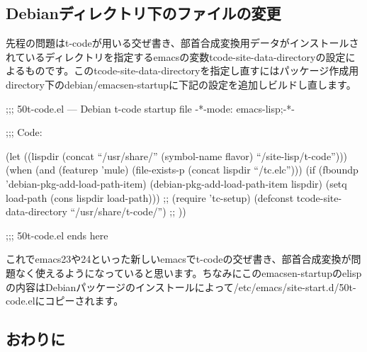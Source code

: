 \documentclass[mingoth,a4paper]{jsarticle}
\begin{document}
\subsection{Debianディレクトリ下のファイルの変更}
先程の問題はt-codeが用いる交ぜ書き、部首合成変換用データがインストールされているディレクトリを指定するemacsの変数tcode-site-data-directoryの設定によるものです。このtcode-site-data-directoryを指定し直すにはパッケージ作成用directory下のdebian/emacsen-startupに下記の設定を追加しビルドし直します。

\begin{commandline}
;;; 50t-code.el --- Debian t-code startup file  -*-mode: emacs-lisp;-*-                                                            

;;; Code:                                                                                                                          

(let ((lispdir (concat ``/usr/share/'' (symbol-name flavor) ``/site-lisp/t-code'')))
  (when (and (featurep 'mule) (file-exists-p (concat lispdir ``/tc.elc'')))
    (if (fboundp 'debian-pkg-add-load-path-item)
        (debian-pkg-add-load-path-item lispdir)
      (setq load-path (cons lispdir load-path)))
    ;;                                                                                                                             
    (require 'tc-setup)
    (defconst tcode-site-data-directory ``/usr/share/t-code/'')
    ;;                                                                                                                             
    ))

;;; 50t-code.el ends here
\end{commandline}


これでemacs23や24といった新しいemacsでt-codeの交ぜ書き、部首合成変換が問題なく使えるようになっていると思います。ちなみにこのemacsen-startupのelispの内容はDebianパッケージのインストールによって/etc/emacs/site-start.d/50t-code.elにコピーされます。

\subsection{おわりに}
\end{document}
